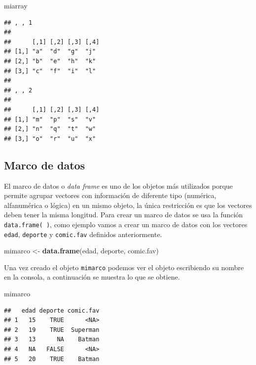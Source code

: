 \documentclass[10pt,]{krantz}
\makeatletter
\newenvironment{Shaded}{\begin{snugshade}}{\end{snugshade}}
\newcommand{\KeywordTok}[1]{\textcolor[rgb]{0.13,0.29,0.53}{\textbf{{#1}}}}
\newcommand{\StringTok}[1]{\textcolor[rgb]{0.31,0.60,0.02}{{#1}}}
\newcommand{\NormalTok}[1]{{#1}}
\newenvironment{kframe}{%
\medskip{}
\setlength{\fboxsep}{.8em}
 \def\at@end@of@kframe{}%
 \ifinner\ifhmode%
  \def\at@end@of@kframe{\end{minipage}}%
  \begin{minipage}{\columnwidth}%
 \fi\fi%
 \def\FrameCommand##1{\hskip\@totalleftmargin \hskip-\fboxsep
 \colorbox{shadecolor}{##1}\hskip-\fboxsep
     \hskip-\linewidth \hskip-\@totalleftmargin \hskip\columnwidth}%
 \MakeFramed {\advance\hsize-\width
   \@totalleftmargin\z@ \linewidth\hsize
   \@setminipage}}%
 {\par\unskip\endMakeFramed%
 \at@end@of@kframe}
\renewenvironment{Shaded}{\begin{kframe}}{\end{kframe}}
\makeatother
\begin{document}
\begin{Shaded}
\begin{Highlighting}[]
\NormalTok{miarray}
\end{Highlighting}
\end{Shaded}

\begin{verbatim}
## , , 1
## 
##      [,1] [,2] [,3] [,4]
## [1,] "a"  "d"  "g"  "j" 
## [2,] "b"  "e"  "h"  "k" 
## [3,] "c"  "f"  "i"  "l" 
## 
## , , 2
## 
##      [,1] [,2] [,3] [,4]
## [1,] "m"  "p"  "s"  "v" 
## [2,] "n"  "q"  "t"  "w" 
## [3,] "o"  "r"  "u"  "x"
\end{verbatim}

\subsection{Marco de datos}

El marco de datos  o \textit{data frame} es uno de
los objetos más utilizados porque permite agrupar vectores con
información de diferente tipo (numérica, alfanumérica o lógica) en un
mismo objeto, la única restricción es que los vectores deben tener la
misma longitud. Para crear un marco de datos se usa la función
\texttt{data.frame(\ )}, como ejemplo vamos a crear un marco de datos
con los vectores \texttt{edad}, \texttt{deporte} y \texttt{comic.fav}
definidos anteriormente.

\begin{Shaded}
\begin{Highlighting}[]
\NormalTok{mimarco <-}\StringTok{ }\KeywordTok{data.frame}\NormalTok{(edad, deporte, comic.fav)}
\end{Highlighting}
\end{Shaded}

Una vez creado el objeto \texttt{mimarco} podemos ver el objeto
escribiendo su nombre en la consola, a continuación se muestra lo que se
obtiene.

\begin{Shaded}
\begin{Highlighting}[]
\NormalTok{mimarco}
\end{Highlighting}
\end{Shaded}

\begin{verbatim}
##   edad deporte comic.fav
## 1   15    TRUE      <NA>
## 2   19    TRUE  Superman
## 3   13      NA    Batman
## 4   NA   FALSE      <NA>
## 5   20    TRUE    Batman
\end{verbatim}
\end{document}
